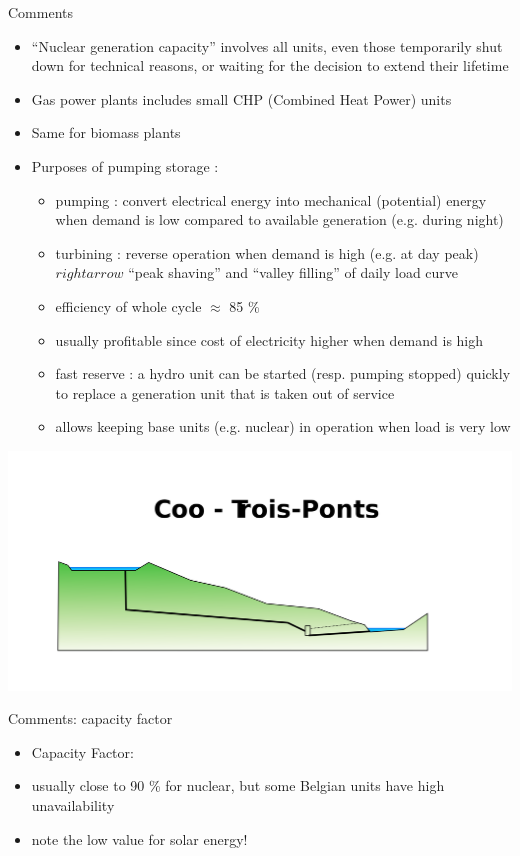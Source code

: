 \begin{frame}
{Comments}
\begin{itemize}
\item “Nuclear generation capacity” involves all units, even those temporarily shut down for technical reasons, or waiting for the decision to extend their lifetime
\item Gas power plants includes small CHP (Combined Heat Power) units
\item Same for biomass plants
\item Purposes of pumping storage :
\begin{itemize}
\item pumping : convert electrical energy into mechanical (potential) energy when demand is low compared to available generation (e.g. during night)
\item turbining : reverse operation when demand is high (e.g. at day peak) $rightarrow$ “peak shaving” and “valley filling” of daily load curve
\item efficiency of whole cycle $\approx$ 85 \%
\item usually profitable since cost of electricity higher when demand is high
\item fast reserve : a hydro unit can be started (resp. pumping stopped) quickly to replace a generation unit that is taken out of service
\item allows keeping base units (e.g. nuclear) in operation when load is very low
\end{itemize}
\end{itemize}
\begin{center}
\includegraphics[width=0.4\linewidth]{images/Coo-Trois-Ponts.svg.png}
\end{center}
\end{frame}

\begin{frame}
{Comments: capacity factor}
\begin{itemize}
\item Capacity Factor:


\item usually close to 90 \% for nuclear, but some Belgian units have high unavailability
\item note the low value for solar energy!
\end{itemize}
\end{frame}

